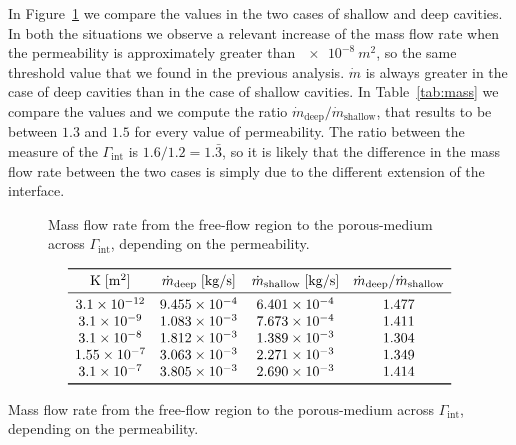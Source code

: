 In Figure~\ref{fig:mass} we compare the values in the two cases of shallow and deep cavities. In both the situations we observe a relevant increase of the mass flow rate when the permeability is approximately greater than $\SI{e-8}{m^2}$, so the same threshold value that we found in the previous analysis. $\dot{m}$ is always greater in the case of deep cavities than in the case of shallow cavities. In Table~\ref{tab:mass} we compare the values and we compute the ratio $\dot{m}_\text{deep} / \dot{m}_\text{shallow}$, that results to be between $1.3$ and $1.5$ for every value of permeability. The ratio between the measure of the $\Gamma_\text{int}$ is $1.6 / 1.2 = 1.\bar{3}$, so it is likely that the difference in the mass flow rate between the two cases is simply due to the different extension of the interface.
\begin{figure}
	\centering
	
	\caption[Mass flow rate across $\Gamma_\text{int}$ depending on the permeability]{Mass flow rate from the free-flow region to the porous-medium across $\Gamma_\text{int}$, depending on the permeability.}
	\label{fig:mass}	
\end{figure}
\begin{table}
	\centering
	\[
	\begin{array}{cccc}
	\toprule
	\mathrm{K} \; [\si{m^2}] & \dot{m}_\text{deep} \; [\si{kg/s}] & \dot{m}_\text{shallow} \; [\si{kg/s}] & \dot{m}_\text{deep} / \dot{m}_\text{shallow}\\
	\midrule
	\num{3.1e-12} & \num{9.455e-4} & \num{6.401e-4} & 1.477\\
	\num{3.1e-9} & \num{1.083e-3} & \num{7.673e-4} & 1.411\\
	\num{3.1e-8} & \num{1.812e-3} & \num{1.389e-3} & 1.304\\
	\num{1.55e-7} & \num{3.063e-3} & \num{2.271e-3} & 1.349\\
	\num{3.1e-7} & \num{3.805e-3} & \num{2.690e-3} & 1.414\\
	\bottomrule
	\end{array}
	\]
	\caption[Mass flow rate across $\Gamma_\text{int}$ depending on the permeability]{Mass flow rate from the free-flow region to the porous-medium across $\Gamma_\text{int}$, depending on the permeability.}
	\label{tab:mass}
\end{table}
